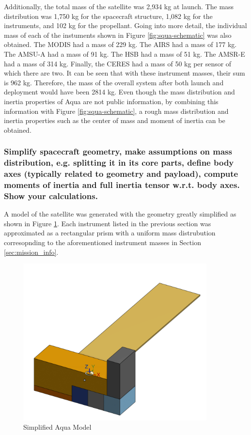 Additionally, the total mass of the satellite was 2,934 kg at launch. The mass distribution was 1,750 kg for the spacecraft structure, 1,082 kg for the instruments, and 102 kg for the propellant. Going into more detail, the individual mass of each of the instuments shown in Figure \ref{fig:squa-schematic} was also obtained. The MODIS had a mass of 229 kg. The AIRS had a mass of 177 kg. The AMSU-A had a mass of 91 kg. The HSB had a mass of 51 kg. The AMSR-E had a mass of 314 kg. Finally, the CERES had a mass of 50 kg per sensor of which there are two. It can be seen that with these instrument masses, their sum is 962 kg. Therefore, the mass of the overall system after both launch and deployment would have been 2814 kg. \cite{aqua_mass_sumaries} Even though the mass distribution and inertia properties of Aqua are not public information, by combining this information with Figure \ref{fig:squa-schematic}, a rough mass distribution and inertia properties such as the center of mass and moment of inertia can be obtained.

\subsubsection{Simplify spacecraft geometry, make assumptions on mass distribution, e.g. splitting it in its core parts, define body axes (typically related to geometry and payload), compute moments of inertia and full inertia tensor w.r.t. body axes. Show your calculations.}

A model of the satellite was generated with the geometry greatly simplified as shown in Figure \ref{fig:aquacad}. Each instrument listed in the previous section was approximated as a rectangular prism with a uniform mass distrubution corresopnding to the aforementioned instrument masses in Section \ref{sec:mission_info}. 


\begin{figure}[H]
    \centering
    \includegraphics[width = 10cm]{Images/AquaSat-1.png}
    \caption{Simplified Aqua Model}
    \label{fig:aquacad}
\end{figure}

